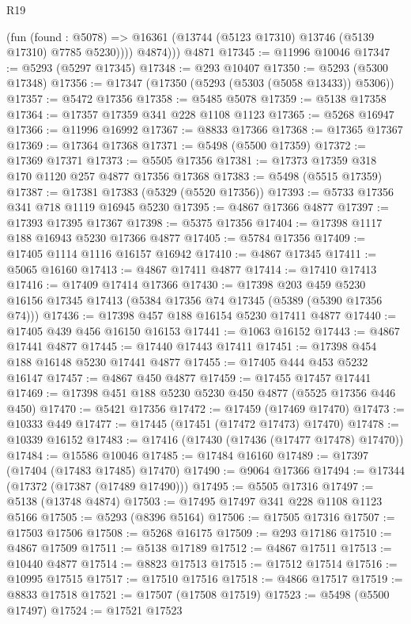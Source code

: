 \begin{lexlean}{R19}
\begin{coremodule}
            (fun (found : @5078) =>
            @16361 (@13744 (@5123 @17310) @13746 (@5139 @17310) @7785 @5230))))
          @4874)))
    @4871
@17345 := @11996 @10046
@17347 := @5293 (@5297 @17345)
@17348 := @293 @10407
@17350 := @5293 (@5300 @17348)
@17356 := @17347 (@17350 (@5293 (@5303 (@5058 @13433)) @5306))
@17357 := @5472 @17356
@17358 := @5485 @5078
@17359 := @5138 @17358
@17364 := @17357 @17359 @341 @228 @1108 @1123
@17365 := @5268 @16947
@17366 := @11996 @16992
@17367 := @8833 @17366
@17368 := @17365 @17367
@17369 := @17364 @17368
@17371 := @5498 (@5500 @17359)
@17372 := @17369 @17371
@17373 := @5505 @17356
@17381 := @17373 @17359 @318 @170 @1120 @257 @4877 @17356 @17368
@17383 := @5498 (@5515 @17359)
@17387 := @17381 @17383 (@5329 (@5520 @17356))
@17393 := @5733 @17356 @341 @718 @1119 @16945 @5230
@17395 := @4867 @17366 @4877
@17397 := @17393 @17395 @17367
@17398 := @5375 @17356
@17404 := @17398 @1117 @188 @16943 @5230 @17366 @4877
@17405 := @5784 @17356
@17409 := @17405 @1114 @1116 @16157 @16942
@17410 := @4867 @17345
@17411 := @5065 @16160
@17413 := @4867 @17411 @4877
@17414 := @17410 @17413
@17416 := @17409 @17414 @17366
@17430 := @17398
    @203
    @459
    @5230
    @16156
    @17345
    @17413
    (@5384 @17356 @74 @17345 (@5389 (@5390 @17356 @74)))
@17436 := @17398 @457 @188 @16154 @5230 @17411 @4877
@17440 := @17405 @439 @456 @16150 @16153
@17441 := @1063 @16152
@17443 := @4867 @17441 @4877
@17445 := @17440 @17443 @17411
@17451 := @17398 @454 @188 @16148 @5230 @17441 @4877
@17455 := @17405 @444 @453 @5232 @16147
@17457 := @4867 @450 @4877
@17459 := @17455 @17457 @17441
@17469 := @17398 @451 @188 @5230 @5230 @450 @4877 (@5525 @17356 @446 @450)
@17470 := @5421 @17356
@17472 := @17459 (@17469 @17470)
@17473 := @10333 @449
@17477 := @17445 (@17451 (@17472 @17473) @17470)
@17478 := @10339 @16152
@17483 := @17416 (@17430 (@17436 (@17477 @17478) @17470))
@17484 := @15586 @10046
@17485 := @17484 @16160
@17489 := @17397 (@17404 (@17483 @17485) @17470)
@17490 := @9064 @17366
@17494 := @17344 (@17372 (@17387 (@17489 @17490)))
@17495 := @5505 @17316
@17497 := @5138 (@13748 @4874)
@17503 := @17495 @17497 @341 @228 @1108 @1123 @5166
@17505 := @5293 (@8396 @5164)
@17506 := @17505 @17316
@17507 := @17503 @17506
@17508 := @5268 @16175
@17509 := @293 @17186
@17510 := @4867 @17509
@17511 := @5138 @17189
@17512 := @4867 @17511
@17513 := @10440 @4877
@17514 := @8823 @17513
@17515 := @17512 @17514
@17516 := @10995 @17515
@17517 := @17510 @17516
@17518 := @4866 @17517
@17519 := @8833 @17518
@17521 := @17507 (@17508 @17519)
@17523 := @5498 (@5500 @17497)
@17524 := @17521 @17523

\end{coremodule}
\end{lexlean}
